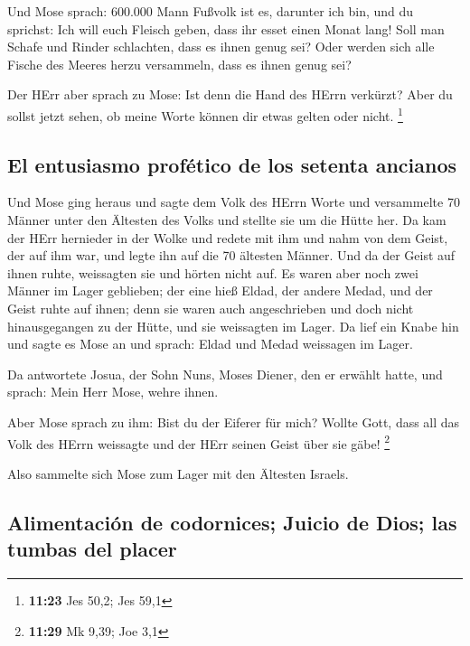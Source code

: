  Und Mose sprach: 600.000 Mann Fußvolk ist es, darunter
ich bin, und du sprichst: Ich will euch Fleisch geben, dass ihr esset
einen Monat lang!  Soll man Schafe und Rinder schlachten,
dass es ihnen genug sei? Oder werden sich alle Fische des Meeres herzu
versammeln, dass es ihnen genug sei?

 Der HErr aber sprach zu Mose: Ist denn die Hand des
HErrn verkürzt? Aber du sollst jetzt sehen, ob meine Worte können dir
etwas gelten oder nicht. \footnote{\textbf{11:23} Jes 50,2; Jes 59,1}

\hypertarget{el-entusiasmo-profuxe9tico-de-los-setenta-ancianos}{%
\subsection{El entusiasmo profético de los setenta
ancianos}\label{el-entusiasmo-profuxe9tico-de-los-setenta-ancianos}}

 Und Mose ging heraus und sagte dem Volk des HErrn Worte
und versammelte 70 Männer unter den Ältesten des Volks und stellte sie
um die Hütte her.  Da kam der HErr hernieder in der Wolke
und redete mit ihm und nahm von dem Geist, der auf ihm war, und legte
ihn auf die 70 ältesten Männer. Und da der Geist auf ihnen ruhte,
weissagten sie und hörten nicht auf.  Es waren aber noch
zwei Männer im Lager geblieben; der eine hieß Eldad, der andere Medad,
und der Geist ruhte auf ihnen; denn sie waren auch angeschrieben und
doch nicht hinausgegangen zu der Hütte, und sie weissagten im Lager.
 Da lief ein Knabe hin und sagte es Mose an und sprach:
Eldad und Medad weissagen im Lager.

 Da antwortete Josua, der Sohn Nuns, Moses Diener, den er
erwählt hatte, und sprach: Mein Herr Mose, wehre ihnen.

 Aber Mose sprach zu ihm: Bist du der Eiferer für mich?
Wollte Gott, dass all das Volk des HErrn weissagte und der HErr seinen
Geist über sie gäbe! \footnote{\textbf{11:29} Mk 9,39; Joe 3,1}

 Also sammelte sich Mose zum Lager mit den Ältesten
Israels.

\hypertarget{alimentaciuxf3n-de-codornices-juicio-de-dios-las-tumbas-del-placer}{%
\subsection{Alimentación de codornices; Juicio de Dios; las tumbas del
placer}\label{alimentaciuxf3n-de-codornices-juicio-de-dios-las-tumbas-del-placer}}

